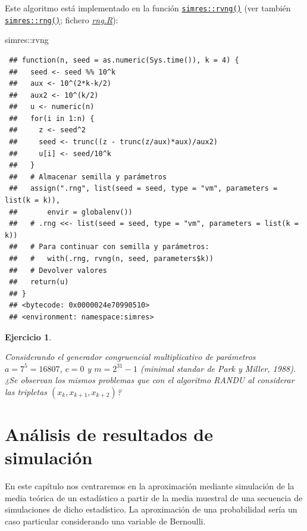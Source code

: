 \documentclass[
  10pt,
]{book}
\newenvironment{Shaded}{\begin{snugshade}}{\end{snugshade}}
\newcommand{\NormalTok}[1]{#1}
\newcommand{\SpecialCharTok}[1]{\textcolor[rgb]{0.00,0.00,0.00}{#1}}
\theoremstyle{break}
\newtheorem{exercise}{Ejercicio}[chapter]
\theoremstyle{nonumberplain}
\begin{document}
Este algoritmo está implementado en la función \href{https://rubenfcasal.github.io/simres/reference/set.rng.html}{\texttt{simres::rvng()}} (ver también \href{https://rubenfcasal.github.io/simres/reference/set.rng.html}{\texttt{simres::rng()}}; fichero \href{R/rng.R}{\emph{rng.R}}):

\begin{Shaded}
\begin{Highlighting}[]
\NormalTok{simres}\SpecialCharTok{::}\NormalTok{rvng}
\end{Highlighting}
\end{Shaded}

\begin{verbatim}
 ## function(n, seed = as.numeric(Sys.time()), k = 4) {
 ##   seed <- seed %% 10^k
 ##   aux <- 10^(2*k-k/2)
 ##   aux2 <- 10^(k/2)
 ##   u <- numeric(n)
 ##   for(i in 1:n) {
 ##     z <- seed^2
 ##     seed <- trunc((z - trunc(z/aux)*aux)/aux2)
 ##     u[i] <- seed/10^k
 ##   }
 ##   # Almacenar semilla y parámetros
 ##   assign(".rng", list(seed = seed, type = "vm", parameters = list(k = k)),
 ##       envir = globalenv())
 ##   # .rng <<- list(seed = seed, type = "vm", parameters = list(k = k))
 ##   # Para continuar con semilla y parámetros:
 ##   #   with(.rng, rvng(n, seed, parameters$k))
 ##   # Devolver valores
 ##   return(u)
 ## }
 ## <bytecode: 0x0000024e70990510>
 ## <environment: namespace:simres>
\end{verbatim}

\begin{exercise}
\protect\hypertarget{exr:parkmiller}{}\label{exr:parkmiller}

Considerando el generador congruencial multiplicativo de parámetros \(a=7^{5}=16807\), \(c=0\) y \(m=2^{31}-1\) (\emph{minimal standar} de Park y Miller, 1988).
¿Se observan los mismos problemas que con el algoritmo RANDU al considerar las tripletas \((x_{k},x_{k+1},x_{k+2})\)?
\end{exercise}

\hypertarget{resultados}{%
\chapter{Análisis de resultados de simulación}\label{resultados}}

En este capítulo nos centraremos en la aproximación mediante simulación de la media teórica de un estadístico a partir de la media muestral de una secuencia de simulaciones de dicho estadístico.
La aproximación de una probabilidad sería un caso particular considerando una variable de Bernoulli.
\end{document}
